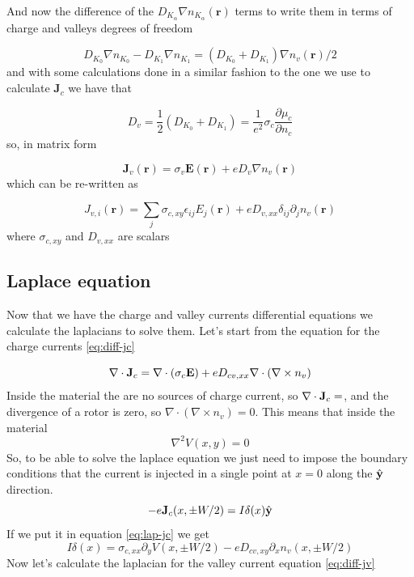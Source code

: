 And now the difference of the $D_{K_\alpha}\nabla n_{K_\alpha}(\mathbf r)$ terms to write them in terms of charge and valleys degrees of freedom

\[D_{K_0}\nabla n_{K_0}-D_{K_1}\nabla n_{K_1}=(D_{K_0}+D_{K_1})\nabla n_v(\mathbf r)/2\]
and with some calculations done in a similar fashion to the one we use to calculate $\mathbf J_c$ we have that

\[D_v=\frac12(D_{K_0}+D_{K_1})=\frac 1{e^2}\sigma_c\frac{\partial \mu_c}{\partial n_c}\]
so, in matrix form


\begin{equation}
    \mathbf J_v(\mathbf r)=\sigma_v\mathbf E(\mathbf r)+eD_{v}\nabla n_v(\mathbf r)    
\end{equation}
which can be re-written as


\begin{equation}
    J_{v,i}(\mathbf r)=\sum_j \sigma_{c,xy} \epsilon_{ij}  E_j(\mathbf r)+eD_{v,xx}\delta_{ij}\partial_j n_v(\mathbf r) 
    \label{eq:diff-jv}  
\end{equation}
where $\sigma_{c,xy}$ and $D_{v,xx}$ are scalars


\subsection{Laplace equation}

Now that we have the charge and valley currents differential equations we calculate the laplacians to solve them. Let's start from the equation for the charge currents \ref{eq:diff-jc}

\begin{equation}
    \nabla \cdot \mathbf{J}_c=\nabla \cdot (\sigma_c \mathbf E)+ eD_{cv,xx}\nabla \cdot (\nabla\times n_v)
    \label{eq:lap-jc}
\end{equation}
Inside the material the are no sources of charge current, so $\nabla \cdot \mathbf{J}_c=$, and the divergence of a rotor is zero, so $\nabla \cdot (\nabla\times n_v)=0$. This means that inside the material
\begin{equation}
    \boxed{
    \nabla^2 V(x,y)=0
    }
\end{equation}
So, to be able to solve the laplace equation we just need to impose the boundary conditions that the current is injected in a single point at $x=0$ along the $\hat{\mathbf{y}}$ direction. 
\[
    -e\mathbf{J}_c(x,\pm W/2)=I\delta(x)\hat{\mathbf{y}}    
\]
If we put it in equation \ref{eq:lap-jc} we get
\begin{equation}
    \boxed{
        I\delta(x)=\sigma_{c,xx}\partial_y V(x,\pm W/2)-eD_{cv,xy}\partial_x n_v(x,\pm W/2)
    }
\end{equation}
Now let's calculate the laplacian for the valley current equation \ref{eq:diff-jv}



